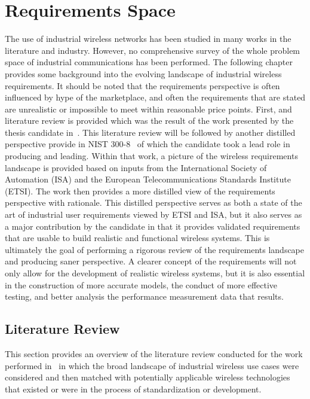 
\chapter{Requirements Space}

\chapterintro*

The use of industrial wireless networks has been studied in many works in the literature and industry. However, no comprehensive survey of the whole problem space of industrial communications has been performed.   The following chapter provides some background into the evolving landscape of industrial wireless requirements.  It should be noted that the requirements perspective is often influenced by hype of the marketplace, and often the requirements that are stated are unrealistic or impossible to meet within reasonable price points.  First, and literature review is provided which was the result of the work presented by the thesis candidate in~\cite{CandellRW2017}.  This literature review will be followed by another distilled perspective provide in NIST 300-8~\cite{Montgomery2019} of which the candidate took a lead role in producing and leading.  Within that work, a picture of the wireless requirements landscape is provided based on inputs from the International Society of Automation (ISA) and the European Telecommunications Standards Institute (ETSI).  The work then provides a more distilled view of the requirements perspective with rationale.  This distilled perspective serves as both a state of the art of industrial user requirements viewed by ETSI and ISA, but it also serves as a major contribution by the candidate in that it provides validated requirements that are usable to build realistic and functional wireless systems.  This is ultimately the goal of performing a rigorous review of the requirements landscape and producing saner perspective.  A clearer concept of the requirements will not only allow for the development of realistic wireless systems, but it is also essential in the construction of more accurate models, the conduct of more effective testing, and better analysis the performance measurement data that results.

\section{Literature Review}\label{sec:litreview:academia}

This section provides an overview of the literature review conducted for the work performed in~\cite{CandellRW2017} in which the broad landscape of industrial wireless use cases were considered and then matched with potentially applicable wireless technologies that existed or were in the process of standardization or development.  

